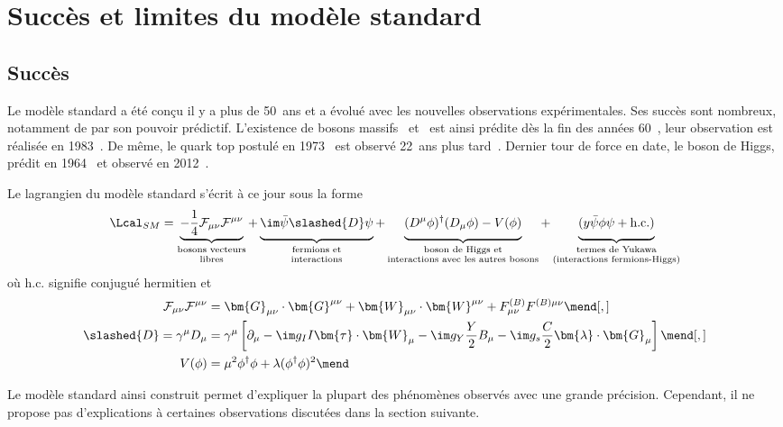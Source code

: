 \section{Succès et limites du modèle standard}\label{chapter-MS-MSSM-section-succes_limites}
\subsection{Succès}\label{chapter-MS-MSSM-section-succes_limites-subsec-succes}
Le modèle standard a été conçu il y a plus de 50~ans et a évolué avec les nouvelles observations expérimentales.
Ses succès sont nombreux, notamment de par son pouvoir prédictif.
L'existence de bosons massifs \Wboson\ et \Zboson\ est ainsi prédite dès la fin des années 60~\cite{Weinberg_leptons_model}, leur observation est réalisée en 1983~\cite{Wboson_discovery1,Wboson_discovery2,Wboson_discovery3,Zboson_discovery1,Zboson_discovery2}.
De même, le quark top postulé en 1973~\cite{CKM_KM} est observé 22~ans plus tard~\cite{top_discovery1,top_discovery2}.
Dernier tour de force en date, le boson de Higgs, prédit en 1964~\cite{Englert_Brout,Higgs_1,Higgs_2,Guralnik_Hagen_Kibble} et observé en 2012~\cite{ATLAS_Higgs_discovery,CMS_Higgs_discovery}.
\par Le lagrangien du modèle standard s'écrit à ce jour sous la forme
\begin{equation}
\Lcal_{SM} = 
\underbrace{- \frac{1}{4} \mathcal{F}_{\mu\nu}\mathcal{F}^{\mu\nu} \vphantom{\frac{1}{4}}}_{\substack{\text{bosons vecteurs\vphantom{YHg}}\\\text{libres\vphantom{(lHg)}}}}
+ \underbrace{\im \bar{\psi} \slashed{D} \psi \vphantom{\frac{1}{4}}}_{\substack{\text{fermions et\vphantom{YHg}}\\\text{interactions\vphantom{(lHg)}}}}
+ \underbrace{(D^\mu\phi)^\dagger(D_\mu\phi) - V(\phi) \vphantom{\frac{1}{4}}}_{\substack{\text{boson de Higgs et\vphantom{YHg}}\\\text{interactions avec les autres bosons\vphantom{(lHg)}}}}
+ \underbrace{(y \bar{\psi}\phi\psi + \text{h.c.}) \vphantom{\frac{1}{4}}}_{\substack{\text{termes de Yukawa\vphantom{YHg}}\\\text{(interactions fermions-Higgs)\vphantom{(lHg)}}}}
\label{eq-SM_lagrangian}
\end{equation}
où \og $\text{h.c.}$ \fg{} signifie conjugué hermitien et
\begin{align}
\mathcal{F}_{\mu\nu}\mathcal{F}^{\mu\nu} &= \bm{G}_{\mu\nu} \cdot \bm{G}^{\mu\nu} + \bm{W}_{\mu\nu} \cdot \bm{W}^{\mu\nu} + F^{(B)}_{\mu\nu} F^{(B)\mu\nu}
\mend[,]\\
\slashed{D} = \gamma^\mu D_\mu &= \gamma^\mu \left[ \partial_\mu - \im g_I I \bm{\tau}\cdot\bm{W}_\mu - \im g_Y \frac{Y}{2} B_\mu - \im g_s \frac{C}{2} \bm{\lambda}\cdot\bm{G}_\mu \right]
\mend[,]\\
V(\phi) &= \mu^2\phi^\dagger\phi + \lambda (\phi^\dagger\phi)^2
\mend
\end{align}
\par Le modèle standard ainsi construit permet d'expliquer la plupart des phénomènes observés avec une grande précision.
Cependant, il ne propose pas d'explications à certaines observations discutées dans la section suivante.
